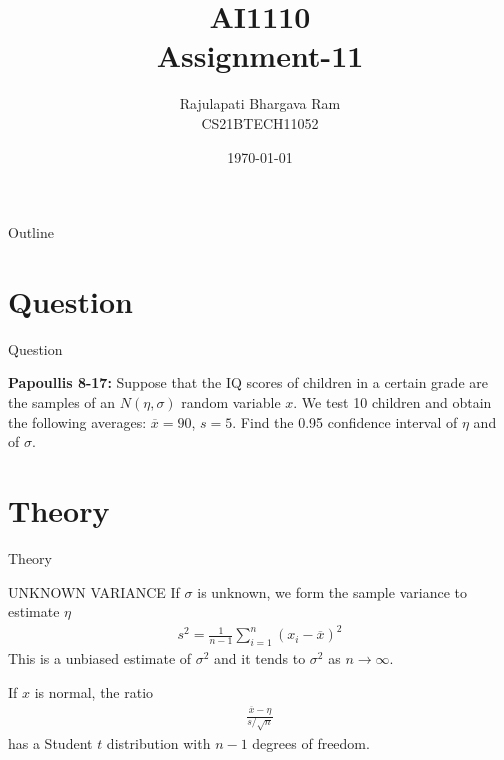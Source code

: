 \documentclass{beamer}
\title{AI1110 \\ Assignment-11}
\author{Rajulapati Bhargava Ram \\ CS21BTECH11052}
\date{\today}
\begin{document}
\begin{frame}
    \titlepage 
\end{frame}
\logo{}


\begin{frame}{Outline}
    \tableofcontents
\end{frame}



\section{Question}
\begin{frame}{Question}
    \begin{block}{\textbf{Papoullis 8-17:} } 
      Suppose that the IQ scores of children in a certain grade are the samples of an $N(\eta, \sigma)$ random variable $x$. We test 10 children and obtain the following averages: $\overline{x}=90$, $s=5$. Find the 0.95 confidence interval of $\eta$ and of $\sigma$.       
     \end{block}
     
\end{frame}


\section{Theory}
\begin{frame}{Theory}
   \begin{block}{UNKNOWN VARIANCE}
      If $\sigma$ is unknown, we form the sample variance to estimate $\eta$
     \begin{align}
       s^2 = \frac{1}{n-1} \sum_{i=1}^{n} (x_i - \overline{x})^2 
     \end{align}
      This is a unbiased estimate of $\sigma^2$ and it tends to $\sigma^2$ as $n \rightarrow \infty$. 
      \end{block}
      
      \begin{block}{}
      If $x$ is normal, the ratio
      \begin{align}
         \frac{\overline{x} - \eta}{s/\sqrt{n}}
      \end{align}
      has a Student $t$ distribution with $n-1$ degrees of freedom.  
  \end{block}   
  
	
\end{frame}
\end{document}
